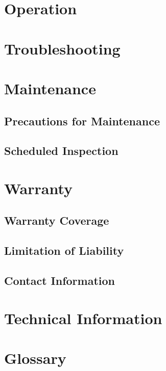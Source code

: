 \documentclass[10pt, openany, english, template]{hzguide}
\begin{document}
\chapter{Operation}\tplactions

\chapter{Troubleshooting}\tplproblems

\chapter{Maintenance}
\section{Precautions for Maintenance}\tpllist
\section{Scheduled Inspection}\tpllist

\chapter{Warranty}
\section{Warranty Coverage}\tplpara*
\section{Limitation of Liability}\tplpara*\tpllist
\section{Contact Information}\tplpara*

\appendix
\chapter{Technical Information}\tplspectables
\chapter{Glossary}\tpllist[terms]

\BackCover
\end{document}
